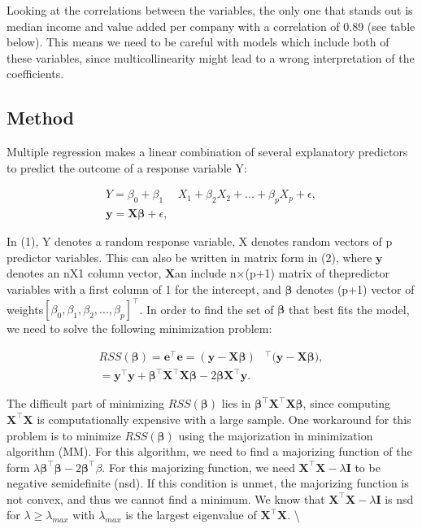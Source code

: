 \documentclass[
]{article}
\begin{document}
Looking at the correlations between the variables, the only one that
stands out is median income and value added per company with a
correlation of 0.89 (see table below). This means we need to be careful
with models which include both of these variables, since
multicollinearity might lead to a wrong interpretation of the
coefficients.

\hypertarget{Method}{%
\subsection{Method}\label{Method}}

Multiple regression makes a linear combination of several explanatory
predictors to predict the outcome of a response variable Y:

\begin{align}
Y = \beta_0 + \beta_1 &X_1+\beta_2 X_2 +...+ \beta_p X_p + \epsilon,
\\
\boldsymbol{y} = \mathbf{X} \boldsymbol{\beta} + \epsilon,
\end{align}

In (1), Y denotes a random response variable, X denotes random vectors
of p predictor variables. This can also be written in matrix form in
(2), where \(\boldsymbol{y}\) denotes an nX1 column vector,
\(\mathbf{X}\)an include n\(\times\)(p+1) matrix of thepredictor
variables with a first column of 1 for the intercept, and
\(\boldsymbol{\beta}\) denotes (p+1) vector of
weights\([\beta_0, \beta_1, \beta_2,...,\beta_p]^\top\). In order to
find the set of \(\boldsymbol{\beta}\) that best fits the model, we need
to solve the following minimization problem:

\begin{align}
 RSS (\boldsymbol{\beta}) = \mathbf{e}^\top \mathbf{e} = (\mathbf{y-X\boldsymbol{\beta}})&^\top (\mathbf{y-X\boldsymbol{\beta})},
\\
=\mathbf{y}^\top \mathbf{y} + \boldsymbol{\beta}^\top\mathbf{X}^\top\mathbf{X}\boldsymbol{\beta} -2\boldsymbol{\beta}\mathbf{X}^\top \mathbf{y}.
\end{align}

The difficult part of minimizing \(RSS (\boldsymbol{\beta})\) lies in
\(\boldsymbol{\beta}^\top\mathbf{X}^\top\mathbf{X}\boldsymbol{\beta}\),
since computing \(\mathbf{X}^\top\mathbf{X}\) is computationally
expensive with a large sample. One workaround for this problem is to
minimize \(RSS (\boldsymbol{\beta})\) using the majorization in
minimization algorithm (MM). For this algorithm, we need to find a
majorizing function of the form
\(\lambda\boldsymbol{\beta}^\top\boldsymbol{\beta} - 2\boldsymbol{\beta}^\top\beta\).
For this majorizing function, we need
\(\mathbf{X}^\top\mathbf{X}-\lambda\mathbf{I}\) to be negative
semidefinite (nsd). If this condition is unmet, the majorizing function
is not convex, and thus we cannot find a minimum. We know that
\(\mathbf{X}^\top\mathbf{X}-\lambda\mathbf{I}\) is nsd for
\(\lambda\geq\lambda_{max}\) with \(\lambda_{max}\) is the largest
eigenvalue of \(\mathbf{X}^\top\mathbf{X}\). \textbackslash{}
\end{document}
